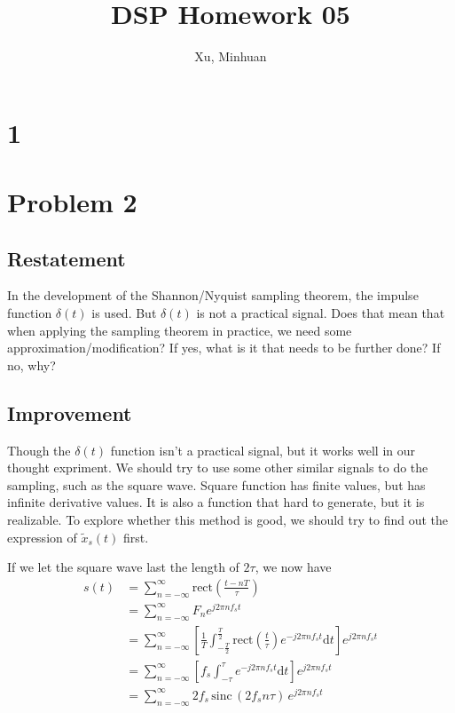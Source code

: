\documentclass{article}
\begin{document}
\title{DSP Homework 05}
\author{Xu, Minhuan}
\maketitle
\tableofcontents
\begin{abstract}

\end{abstract}

\section{1}

\section{Problem 2}

\subsection{Restatement}
In the development of the Shannon/Nyquist sampling theorem, the impulse function $\delta (t)$ is used. But $\delta (t)$ is not a practical signal. Does that mean that when applying the sampling theorem in practice, we need some approximation/modification? If yes, what is it that needs to be further done? If no, why?

\subsection{Improvement}

Though the $\delta (t)$ function isn't a practical signal, but it works well in our thought expriment. We should try to use some other similar signals to do the sampling, such as the square wave. Square function has finite values, but has infinite derivative values. It is also a function that hard to generate, but it is realizable. To explore whether this method is good, we should try to find out the expression of $\widetilde{x}_s(t)$ first.

If we let the square wave last the length of $2\tau$, we now have
\begin{equation}
    \begin{aligned}
        s(t) &= \sum_{n = -\infty}^{\infty} \mathrm{rect} (\frac{t - nT}{\tau}) \\
        &= \sum_{n = -\infty}^{\infty}F_n e^{j2 \pi n f_s t} \\
        &= \sum_{n = -\infty}^{\infty}\left[ \frac{1}{T} \int_{-\frac T2}^{\frac T2} \mathrm{rect}(\frac{t}{\tau}) e^{-j2 \pi n f_s t} \mathrm{d}t \right] e^{j2 \pi n f_s t} \\
        &= \sum_{n = -\infty}^{\infty}\left[ f_s \int_{-\tau}^{\tau} e^{-j2 \pi n f_s t} \mathrm{d}t \right] e^{j2 \pi n f_s t} \\
        &= \sum_{n = -\infty}^{\infty}2f_s\, \mathrm{sinc} \,( 2f_s n\tau)\, e^{j2 \pi n f_s t} \label{rect_st} \\
    \end{aligned}
\end{equation}
\end{document}
